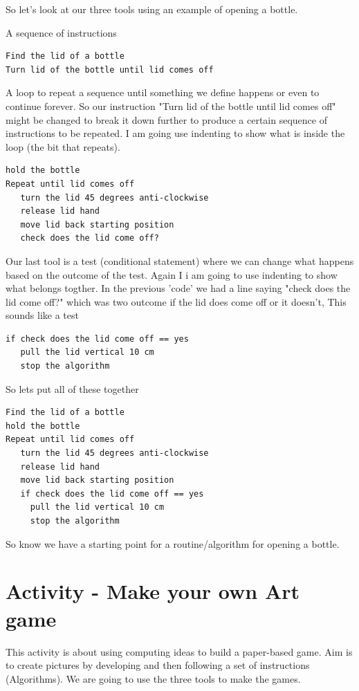 So let's look at our three tools using an example of opening a bottle.

A sequence of instructions
\begin{lstlisting}
Find the lid of a bottle
Turn lid of the bottle until lid comes off
\end{lstlisting}

A loop to repeat a sequence until something we define happens or even to continue forever. So our instruction "Turn lid of the bottle until lid comes off" might be changed to break it down further to produce a certain sequence of instructions to be repeated. I am going use indenting to show what is inside the loop (the bit that repeats).
\begin{lstlisting}
hold the bottle
Repeat until lid comes off
   turn the lid 45 degrees anti-clockwise
   release lid hand 
   move lid back starting position
   check does the lid come off?
\end{lstlisting}

Our last tool is a test (conditional statement) where we can change what happens based on the outcome of the test. Again I i am going to use indenting to show what belongs togther. In the previous 'code' we had a line saying "check does the lid come off?" which was two outcome if the lid does come off or it doesn't, This sounds like a test

\begin{lstlisting}
if check does the lid come off == yes
   pull the lid vertical 10 cm
   stop the algorithm
\end{lstlisting}

So lets put all of these together
\begin{lstlisting}
Find the lid of a bottle
hold the bottle
Repeat until lid comes off
   turn the lid 45 degrees anti-clockwise
   release lid hand 
   move lid back starting position
   if check does the lid come off == yes
     pull the lid vertical 10 cm
     stop the algorithm
\end{lstlisting}

So know we have a starting point for a routine/algorithm for opening a bottle. 

\section{Activity - Make your own Art game}
This activity is about using computing ideas to build a paper-based game. Aim is to create pictures by developing and then following a set of instructions (Algorithms). We are going to use the three tools to make the games. 

